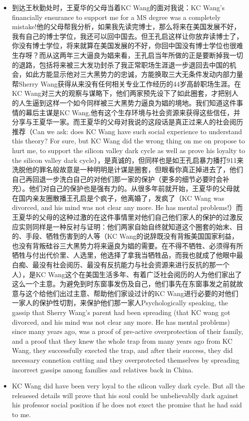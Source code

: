 \documentclass[9pt, b5paper]{article}
\begin{document}
\begin{itemize}
\begin{itemize}
\begin{itemize}
\item 到达王秋勤处时，王夏华的父母当着KC Wang的面对我说：KC Wang's financially ensurance to support me for a MS degree was a completely mistake!他的父母帮我分析，如果我先读完博士，那么将来在美国发展不好，我有自己的博士学位，我还可以回中国去。但王孔启这样让你放弃读博士了，你没有博士学位，将来就算在美国发展的不好，你回中国没有博士学位也很难生存呀？而从这两年三大逼良为娼来看，王孔启当年所做的正是要断掉我一切的退路，包括将来被三大发功封杀了我正常职场生涯退一步退回去中国的机会，如此方能显示他对三大黑势力的忠诚，方能换取三大无条件发动内部力量帮Sherry Wang获得从来没有任何相关专业工作经历的44岁高龄职场生涯。在KC Wang对三大的观察与谋略下，他们两家预先设下了如此圈套，才把别人的人生逼到这样一个如今同样被三大黑势力逼良为娼的境地。我们知道这件事情的幕后主谋是KC Wang,他有这个生存环境与社会资源来获得这些信任，并分享与王夏华一家。而王夏华的父母对我说的这段话是真正过来人的社会阅历推荐（Can we ask: does KC Wang have such social experience to understand this theory? For sure, but KC Wang did the wrong thing on me on propose to hurt me, to support the silicon valley dark cycle as well as prove his loyalty to the silicon valley dark cycle），是真诚的，但同样也是如王孔启暴力播打911来洗脱他的罪名般故意是一种明明是计谋是圈套，但眼看你真正掉进去了，他们自己再回退一步洗白自己的对他们那一家的保护（更多的细节必要时会补充）。他们对自己的保护也是强有力的。从很多年前就开始，王夏华的父母就在国内亲友圈散播王孔启是个疯子，他离婚了，发疯了（KC Wang was divorced, and his mind was not clear any more. He has mental problems!）而王夏华的父母的这种过激的在这件事情里对他们自己他们家人的保护的过激反应实则同样是一种反衬与证明：他们两家自始自终就知道这个圈套的始末、目的、手段、牺牲伤害到的人等（KC Wang的说辞既没有背叛美国国家利益，也没有背叛硅谷三大黑势力将来逼良为娼的需要。在不得不牺牲、必须得有所牺牲与付出代价里、人选里，他选择了拿我当牺牲品，而我也就成了他眼中最白痴、最没有社会阅历、最没有反抗能力与社会资源来进行反抗的那一个人），是KC Wang这个在美国生活多年、有着广泛社会阅历的人为他们家出了这么一个主意。为避免到时东窗事发伤及自己，他们事先在东窗事发之前就故意与这个给他们出过主意、帮助他们家设过计的KC Wang进行必要的对他们一家人的保护性切割，来保护他们那一家人Psychologically speaking, the gassip that Sherry Wang's parent had been spreading (that KC wang got divorced, and his mind was not clear any more. He has mental problems) since many years ago, was a proof of pre-active overprotection of their family, and a proof that they knew the whole trap from many years ago from KC Wang, they successfully exected the trap, and after their success, they did necessary connetion cutting and they overprotected themselves by spreading incorrect gassips among families and relatives back in China.
\item KC Wang did have been very loyal to the silicon valley dark cycle. But all the releaesed details will prove that his soul could be unbelievablly dark against his professor social position if he does not exect the promise that he had said to me.
\end{itemize}
\end{itemize}


\end{itemize}
\end{document}
